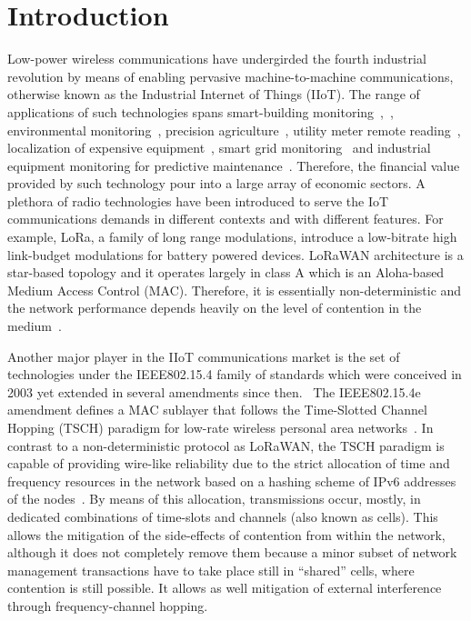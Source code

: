 \documentclass[journal,article,submit,moreauthors,pdftex]{Definitions/mdpi}
\begin{document}
\section{Introduction}
\label{sec:introduction}


Low-power wireless communications have undergirded the fourth industrial revolution by means of enabling pervasive machine-to-machine communications, otherwise known as the Industrial Internet of Things (IIoT).
The range of applications of such technologies spans smart-building monitoring~\cite{munoz18overview},~\cite{kazmi14review}, environmental monitoring~\cite{munoz18evaluationa}, precision agriculture~\cite{watteyne16peacha}, utility meter remote reading~\cite{sum17experimental}, localization of expensive equipment~\cite{tanakademo}, smart grid monitoring~\cite{fadel15survey} and industrial equipment monitoring for predictive maintenance~\cite{civerchia17industrial}.
Therefore, the financial value provided by such technology pour into a large array of economic sectors.
A plethora of radio technologies have been introduced to serve the IoT communications demands in different contexts and with different features.
For example, LoRa, a family of long range modulations, introduce a low-bitrate high link-budget modulations for battery powered devices.
LoRaWAN architecture is a star-based topology and it operates largely in class A which is an Aloha-based Medium Access Control (MAC).
Therefore, it is essentially non-deterministic and the network performance depends heavily on the level of contention in the medium~\cite{adelantado17understanding}.


Another major player in the IIoT communications market is the set of technologies under the IEEE802.15.4 family of standards which were conceived in 2003 yet extended in several amendments since then.~\cite{std_ieee802154}
The  IEEE802.15.4e amendment defines a MAC sublayer that follows the Time-Slotted Channel Hopping (TSCH) paradigm for low-rate wireless personal area networks~\cite{std_ieee802154}.
In contrast to a non-deterministic protocol as LoRaWAN, the TSCH paradigm is capable of providing wire-like reliability due to the strict allocation of time and frequency resources in the network based on a hashing scheme of IPv6 addresses of the nodes~\cite{draft-ietf-6tisch-msf}.
By means of this allocation, transmissions occur, mostly, in dedicated combinations of time-slots and channels (also known as cells).
This allows the mitigation of the side-effects of contention from within the network, although it does not completely remove them because a minor subset of network management transactions have to take place still in ``shared'' cells, where contention is still possible.
It allows as well mitigation of external interference through frequency-channel hopping.
\end{document}
